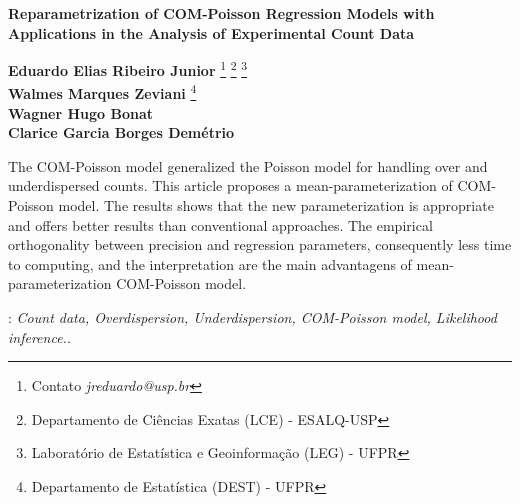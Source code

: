 \documentclass[12pt, a4paper]{article}
\begin{document}
\onehalfspacing

\begin{center}
\begin{center}
\textbf{\Large{Reparametrization of COM-Poisson Regression Models with
    Applications in the Analysis of Experimental Count Data}}\\[1em]
\end{center}
\end{center}
\vspace*{0.2cm}

\begin{flushright}
  {\bf Eduardo Elias Ribeiro Junior}
  \footnote[$\dagger$]{Contato \textit{jreduardo@usp.br}}
  \footnote[1]{Departamento de Ciências Exatas (LCE) - ESALQ-USP}
  \footnote[3]{Laboratório de Estatística e Geoinformação (LEG) -
    UFPR}\\
  {\bf Walmes Marques Zeviani} \footnote[2]{
    Departamento de Estatística (DEST) - UFPR} \footnotemark[3]\\
  {\bf Wagner Hugo Bonat} \footnotemark[2] \footnotemark[3]\\
  {\bf Clarice Garcia Borges Demétrio} \footnotemark[1]
\end{flushright}

\vspace*{0.5cm}


\noindent
The COM-Poisson model generalized the Poisson model for handling over
and underdispersed counts. This article proposes a
mean-parameterization of COM-Poisson model. The results shows that the
new parameterization is appropriate and offers better results than
conventional approaches. The empirical orthogonality between precision
and regression parameters, consequently less time to computing, and the
interpretation are the main advantagens of mean-parameterization
COM-Poisson model.

: {\it Count data, Overdispersion,
  Underdispersion, COM-Poisson model, Likelihood inference.}.\\
\end{document}
